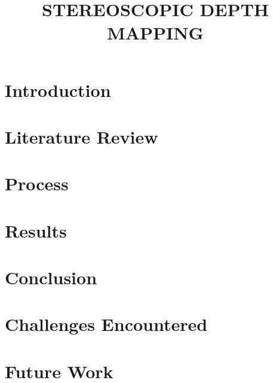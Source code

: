 \documentclass{article}
\begin{document}
\sloppy

\title{STEREOSCOPIC DEPTH MAPPING}
\address{Rose-Hulman Institute of Technology\\
Terre Haute, Indiana}

\maketitle
\thispagestyle{fancy} \fancyhead{} \lhead{}
\renewcommand{\headrulewidth}{0pt}
\renewcommand{\footrulewidth}{0pt}



\section{Introduction}
\label{sec:intro}


\section{Literature Review}
\label{sec:litreview}


\section{Process}
\label{sec:Process}


\section{Results}
\label{sec:Results}


\section{Conclusion}
\label{sec:conclusion}


\section{Challenges Encountered}
\label{conclusion:challenges}


\section{Future Work}
\label{sec:future}

\end{document}
